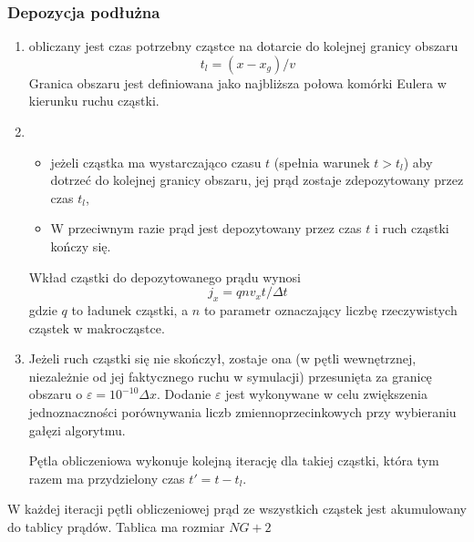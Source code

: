     \subsubsection{Depozycja podłużna}
    \begin{enumerate}
        \item obliczany jest czas potrzebny cząstce na dotarcie do kolejnej
        granicy obszaru
        \begin{equation}
            t_l = (x - x_g)/v
        \end{equation}
        Granica obszaru jest definiowana jako najbliższa połowa komórki Eulera w kierunku
        ruchu cząstki.
        \item
        \begin{itemize}
            \item jeżeli cząstka ma wystarczająco czasu $t$ (spełnia warunek $t > t_l$) aby
            dotrzeć do kolejnej granicy obszaru, jej prąd zostaje zdepozytowany przez czas $t_l$,
            \item W przeciwnym razie prąd jest depozytowany przez czas $t$ i ruch cząstki kończy się.
        \end{itemize}
        Wkład cząstki do depozytowanego prądu wynosi
        \begin{equation}
            j_x = q n v_x t/\Delta t
        \end{equation}
        gdzie $q$ to ładunek cząstki, a $n$ to parametr  oznaczający liczbę
        rzeczywistych cząstek w makrocząstce.

        \item Jeżeli ruch cząstki się nie skończył, zostaje ona (w pętli
        wewnętrznej, niezależnie od jej faktycznego ruchu w symulacji)
         przesunięta za granicę obszaru o $\varepsilon =
        10^{-10} \Delta x$. Dodanie $\varepsilon$ jest wykonywane w celu zwiększenia
        jednoznaczności porównywania liczb zmiennoprzecinkowych przy wybieraniu
        gałęzi algorytmu.

        Pętla obliczeniowa wykonuje kolejną iterację dla takiej cząstki, która tym razem
        ma przydzielony czas $t' = t - t_l$.

    \end{enumerate}

    W każdej iteracji pętli obliczeniowej prąd ze wszystkich cząstek jest
    akumulowany do tablicy prądów. Tablica ma rozmiar $NG+2$ 

